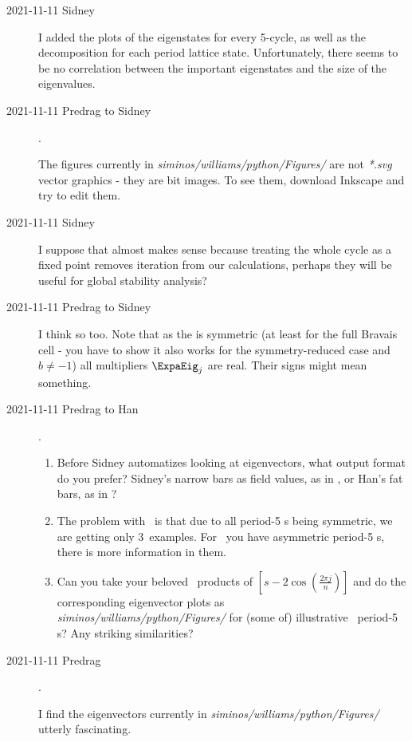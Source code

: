 \begin{description}
\item[2021-11-11 Sidney]
I added the plots of the eigenstates for every 5-cycle, as well as the
decomposition for each period lattice state. Unfortunately, there seems to be
no correlation between the important eigenstates and the size of the
eigenvalues.
\item[2021-11-11 Predrag to Sidney].

The figures currently in \emph{siminos/williams/python/Figures/} are not
\emph{*.svg} vector graphics - they are bit images. To see them, download
 {Inkscape} and
try to edit them.

\item[2021-11-11 Sidney]
I suppose that almost makes sense because treating the whole
cycle as a fixed point removes iteration from our calculations, perhaps they
will be useful for global stability analysis?
\item[2021-11-11 Predrag to Sidney]
I think so too. Note that as the {\jacobianOrb} is symmetric (at least for the full
Bravais cell - you have to show it also works for the symmetry-reduced case
and $b\neq-1$)
all multipliers $\ExpaEig_j$ are real. Their signs might mean something.


\item[2021-11-11 Predrag to Han].
\begin{enumerate}
  \item
Before Sidney automatizes looking at eigenvectors, what output format do you
prefer?
Sidney's narrow bars as field values, as in ,
or Han's fat bars, as in ?
  \item
The problem with \henlatt\ is that due to all period-5 {\lattstate}s being symmetric,
we are getting only 3\dmn\ examples. For \templatt\ you have asymmetric
period-5 {\lattstate}s, there is more information in them.
  \item
Can you take your beloved \templatt\ products of $
\left[s-2\cos\left(\frac{2\pi{j}}{n}\right)\right]$ and do the corresponding
eigenvector plots as
\\
\emph{siminos/williams/python/Figures/} for (some of)
illustrative \templatt\ period-5 {\lattstate}s? Any striking similarities?

\end{enumerate}

\item[2021-11-11 Predrag].

I find the eigenvectors currently in \emph{siminos/williams/python/Figures/}
utterly fascinating.


\end{description}
